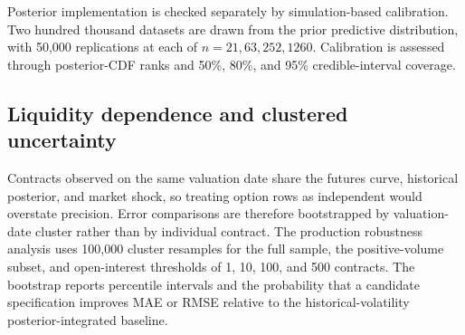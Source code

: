 Posterior implementation is checked separately by simulation-based calibration. Two hundred thousand datasets are drawn from the prior predictive distribution, with 50,000 replications at each of $n=21,63,252,1260$. Calibration is assessed through posterior-CDF ranks and 50\%, 80\%, and 95\% credible-interval coverage.

\subsection{Liquidity dependence and clustered uncertainty}

Contracts observed on the same valuation date share the futures curve, historical posterior, and market shock, so treating option rows as independent would overstate precision. Error comparisons are therefore bootstrapped by valuation-date cluster rather than by individual contract. The production robustness analysis uses 100,000 cluster resamples for the full sample, the positive-volume subset, and open-interest thresholds of 1, 10, 100, and 500 contracts. The bootstrap reports percentile intervals and the probability that a candidate specification improves MAE or RMSE relative to the historical-volatility posterior-integrated baseline.

